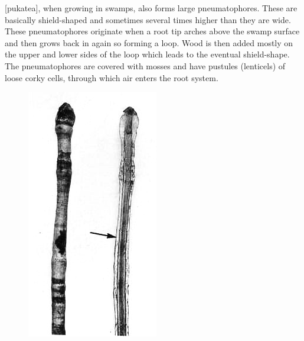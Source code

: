 [pukatea], when growing in swamps, also forms large pneumatophores.
These are basically shield-shaped and sometimes several times higher than they are wide.
These pneumatophores originate when a root tip arches above the swamp surface and then grows back in again so forming a loop.
Wood is then added mostly on the upper and lower sides of the loop which leads to the eventual shield-shape.
The pneumatophores are covered with mosses and have pustules (lenticels) of loose corky cells, through which air enters the root system.

\begin{figure}[t]
	\begin{minipage}[t]{\textwidth}
		\begin{minipage}[t]{(\textwidth-\fgap-\fgap) * \real{0.280}}
			\includegraphics[width=\textwidth]{graphics/figure12swampmaire.jpg}

\end{minipage}
\end{minipage}
\end{figure}
